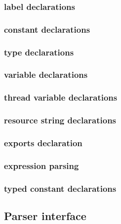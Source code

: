 \documentclass [12pt]{article}
\begin{document}
\subsubsection{label declarations }
\label{subsubsec:mylabel13}

\subsubsection{constant declarations}
\label{subsubsec:mylabel14}

\subsubsection{type declarations}
\label{subsubsec:mylabel15}

\subsubsection{variable declarations}
\label{subsubsec:mylabel16}

\subsubsection{thread variable declarations}
\label{subsubsec:thread}

\subsubsection{resource string declarations}
\label{subsubsec:resource}

\subsubsection{exports declaration}
\label{subsubsec:exports}

\subsubsection{expression parsing }
\label{subsubsec:expression}

\subsubsection{typed constant declarations}
\label{subsubsec:mylabel17}

\subsection{Parser interface}
\label{subsec:parser}
\end{document}
